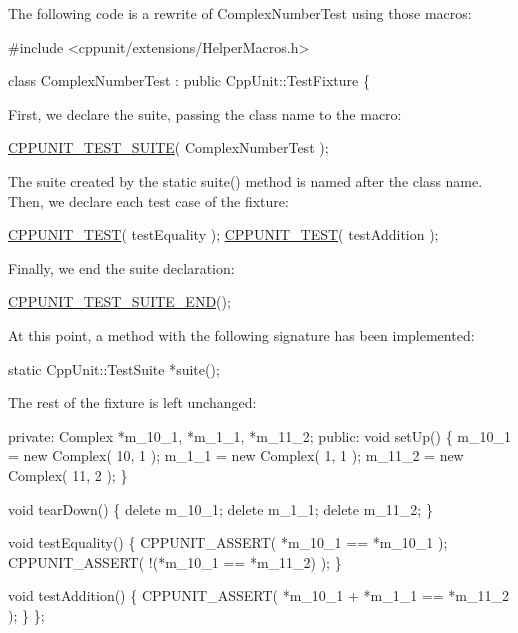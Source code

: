 The following code is a rewrite of Complex\+Number\+Test using those macros\+:


\begin{DoxyCode}
\textcolor{preprocessor}{#include <cppunit/extensions/HelperMacros.h>}

\textcolor{keyword}{class }ComplexNumberTest : \textcolor{keyword}{public} CppUnit::TestFixture  \{
\end{DoxyCode}
 First, we declare the suite, passing the class name to the macro\+: 
\begin{DoxyCode}
\hyperlink{group___writing_test_fixture_gabe1e12200f40d6f25d60c1783c99da81}{CPPUNIT\_TEST\_SUITE}( ComplexNumberTest );
\end{DoxyCode}
 The suite created by the static {\ttfamily suite()} method is named after the class name. Then, we declare each test case of the fixture\+: 
\begin{DoxyCode}
\hyperlink{group___writing_test_fixture_gaac9b03d898b207e1daf2f93867935a96}{CPPUNIT\_TEST}( testEquality );
\hyperlink{group___writing_test_fixture_gaac9b03d898b207e1daf2f93867935a96}{CPPUNIT\_TEST}( testAddition );
\end{DoxyCode}
 Finally, we end the suite declaration\+: 
\begin{DoxyCode}
\hyperlink{group___writing_test_fixture_ga601b2e1d525f3947b216e28c625abcb1}{CPPUNIT\_TEST\_SUITE\_END}();
\end{DoxyCode}
 At this point, a method with the following signature has been implemented\+: 
\begin{DoxyCode}
\textcolor{keyword}{static} CppUnit::TestSuite *suite();
\end{DoxyCode}
 The rest of the fixture is left unchanged\+: 
\begin{DoxyCode}
\textcolor{keyword}{private}:
  Complex *m\_10\_1, *m\_1\_1, *m\_11\_2;
\textcolor{keyword}{public}:
  \textcolor{keywordtype}{void} setUp()
  \{
    m\_10\_1 = \textcolor{keyword}{new} Complex( 10, 1 );
    m\_1\_1 = \textcolor{keyword}{new} Complex( 1, 1 );
    m\_11\_2 = \textcolor{keyword}{new} Complex( 11, 2 );  
  \}

  \textcolor{keywordtype}{void} tearDown() 
  \{
    \textcolor{keyword}{delete} m\_10\_1;
    \textcolor{keyword}{delete} m\_1\_1;
    \textcolor{keyword}{delete} m\_11\_2;
  \}

  \textcolor{keywordtype}{void} testEquality()
  \{
    CPPUNIT\_ASSERT( *m\_10\_1 == *m\_10\_1 );
    CPPUNIT\_ASSERT( !(*m\_10\_1 == *m\_11\_2) );
  \}

  \textcolor{keywordtype}{void} testAddition()
  \{
    CPPUNIT\_ASSERT( *m\_10\_1 + *m\_1\_1 == *m\_11\_2 );
  \}
\};
\end{DoxyCode}


